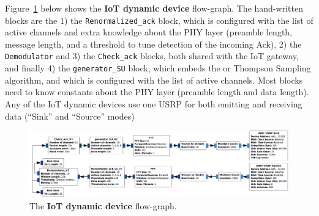 Figure~\ref{fig:4app:USRP_TX_SU__v1__simple_grc} below shows the \textbf{IoT dynamic device} flow-graph.
The hand-written blocks are the
1) the \texttt{Renormalized\_ack} block, which is configured with the list of active channels and extra knowledge about the PHY layer (preamble length, message length, and a threshold to tune detection of the incoming Ack),
2) the \texttt{Demodulator} and 3) the \texttt{Check\_ack} blocks, both shared with the IoT gateway,
and finally 4) the \texttt{generator\_SU} block, which embeds the \UCB{} or Thompson Sampling algorithm, and which is configured with the list of active channels. Most blocks need to know constants about the PHY layer (preamble length and data length). Any of the IoT dynamic devices use one USRP for both emitting and receiving data (``Sink'' and ``Source'' modes)

\begin{figure}[!h]
	\centering
    \includegraphics[width=1.00\textwidth]{2-Chapters/4-Chapter/Images/USRP_TX_SU__v1__simple_grc.png}
    \caption{The \textbf{IoT dynamic device} flow-graph.}
    \label{fig:4app:USRP_TX_SU__v1__simple_grc}
\end{figure}